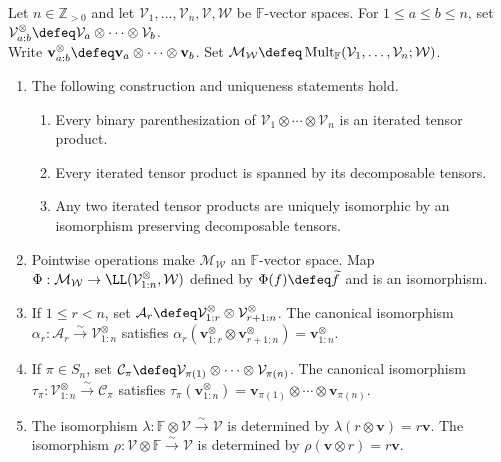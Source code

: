 \begin{theorem} \label{thm:iterated-tensor-products-basic-laws} \\
Let $n\in\mathbb{Z}_{>0}$ and let $\mathcal{V}_1,\ldots,\mathcal{V}_n,\mathcal{V},\mathcal{W}$ be $\mathbb{F}$-vector spaces. For $1\leq a\leq b\leq n$, set $\mathcal{V}_{a:b}^{\otimes}\defeq\mathcal{V}_a\otimes\cdots\otimes\mathcal{V}_b$.\\
Write $\mathbf{v}_{a:b}^{\otimes}\defeq\mathbf{v}_a\otimes\cdots\otimes\mathbf{v}_b$. Set $\mathcal{M}_{\mathcal{W}}\defeq\operatorname{Mult}_{\mathbb{F}}(\mathcal{V}_1,\ldots,\mathcal{V}_n;\mathcal{W})$.
\begin{enumerate}[label=(\roman*)]
\setlength{\itemsep}{0pt}
\item The following construction and uniqueness statements hold.
\begin{enumerate}[label=(\alph*)]
\setlength{\itemsep}{0pt}
\item Every binary parenthesization of $\mathcal{V}_1\otimes\cdots\otimes\mathcal{V}_n$ is an iterated tensor product.
\item Every iterated tensor product is spanned by its decomposable tensors.
\item Any two iterated tensor products are uniquely isomorphic by an isomorphism preserving decomposable tensors.
\end{enumerate}
\item Pointwise operations make $\mathcal{M}_{\mathcal{W}}$ an $\mathbb{F}$-vector space. Map $\Phi:\mathcal{M}_{\mathcal{W}}\to\LL(\mathcal{V}_{1:n}^{\otimes},\mathcal{W})$ defined by $\Phi(f)\defeq\widetilde{f}$ and is an isomorphism.
\item If $1\leq r<n$, set $\mathcal{A}_r\defeq\mathcal{V}_{1:r}^{\otimes}\otimes\mathcal{V}_{r+1:n}^{\otimes}$. The canonical isomorphism $\alpha_r:\mathcal{A}_r\xrightarrow{\sim}\mathcal{V}_{1:n}^{\otimes}$ satisfies $\alpha_r(\mathbf{v}_{1:r}^{\otimes}\otimes\mathbf{v}_{r+1:n}^{\otimes})=\mathbf{v}_{1:n}^{\otimes}$.
\item If $\pi\in S_n$, set $\mathcal{C}_\pi\defeq\mathcal{V}_{\pi(1)}\otimes\cdots\otimes\mathcal{V}_{\pi(n)}$. The canonical isomorphism $\tau_\pi:\mathcal{V}_{1:n}^{\otimes}\xrightarrow{\sim}\mathcal{C}_\pi$ satisfies $\tau_\pi(\mathbf{v}_{1:n}^{\otimes})=\mathbf{v}_{\pi(1)}\otimes\cdots\otimes\mathbf{v}_{\pi(n)}$.
\item The isomorphism $\lambda:\mathbb{F}\otimes\mathcal{V}\xrightarrow{\sim}\mathcal{V}$ is determined by $\lambda(r\otimes\mathbf{v})=r\mathbf{v}$. The isomorphism $\rho:\mathcal{V}\otimes\mathbb{F}\xrightarrow{\sim}\mathcal{V}$ is determined by $\rho(\mathbf{v}\otimes r)=r\mathbf{v}$.

\end{enumerate}
\end{theorem}
